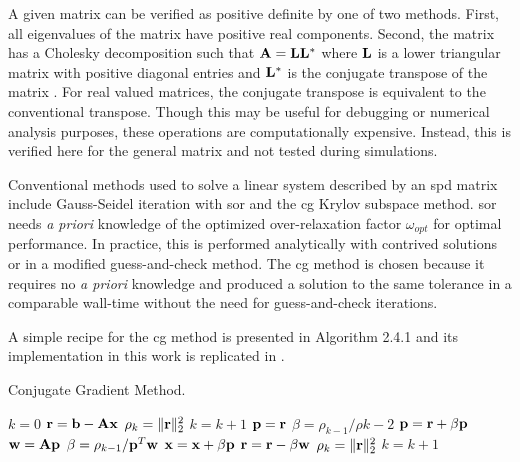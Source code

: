     A given matrix can be verified as positive definite by one of two methods.
    First, all eigenvalues of the matrix have positive real components. Second, 
    the matrix has a Cholesky decomposition such that $\mathbf{A} = \mathbf{L} \mathbf{L}^*$ where 
    $\mathbf{L}$ is a lower triangular matrix with positive diagonal entries and 
    $\mathbf{L}^*$ is the conjugate transpose of the matrix \cite{textbookipsen}. For 
    real valued matrices, the conjugate transpose is equivalent to the 
    conventional transpose. Though this may be useful for debugging or numerical
    analysis purposes, these operations are computationally expensive. Instead,
    this is verified here for the general matrix and not tested during
    simulations.
    
    Conventional methods used to solve a linear system described by an \gls{spd}
    matrix include Gauss-Seidel iteration with \gls{sor} and the \gls{cg} Krylov 
    subspace method. \gls{sor} needs \textit{a priori} knowledge of the 
    optimized over-relaxation factor $\omega_{opt}$ for optimal performance. In 
    practice, this is performed analytically with contrived solutions or in a 
    modified guess-and-check method. The \gls{cg} method is chosen because it 
    requires no \textit{a priori} knowledge and produced a solution to the same 
    tolerance in a comparable wall-time without the need for guess-and-check 
    iterations.
    
    A simple recipe for the \gls{cg} method is presented in Algorithm 2.4.1
    \cite{Kelley1995IterativeEquations} and its implementation in this 
    work is replicated in .
    
    \begin{algorithm}
      \caption{Conjugate Gradient Method.}
      \label{algorithm:CG}
      \begin{algorithmic}[1]
        \State $k = 0$
        \State $\mathbf{r} = \mathbf{b} - \mathbf{A} \mathbf{x}$
        \State $\rho_k = \|\mathbf{r}\|_2^2$
        \State $k = k + 1$
            \State $\mathbf{p} = \mathbf{r}$
          \Else
            \State $\beta = \rho_{k-1} / \rho{k-2}$
            \State $\mathbf{p} = \mathbf{r} + \beta \mathbf{p}$
          \EndIf
          \State $\mathbf{w} = \mathbf{A} \mathbf{p}$
          \State $\beta = \rho_{k-1} / \mathbf{p}^{T} \mathbf{w}$
          \State $\mathbf{x} = \mathbf{x} + \beta \mathbf{p}$
          \State $\mathbf{r} = \mathbf{r} - \beta \mathbf{w}$
          \State $\rho_k = \| \mathbf{r} \|_2^2$
          \State $k=k+1$
        \EndWhile
      \end{algorithmic}
    \end{algorithm}
    
